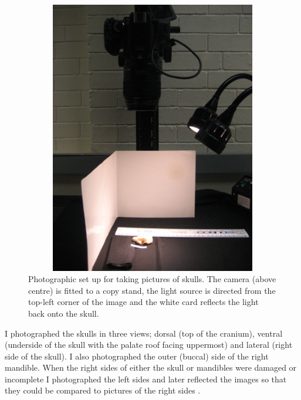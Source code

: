 \begin{figure}[h] 
  \centering
  \includegraphics[width=12cm, height=12cm, keepaspectratio=true]{Methods/figures/camera.jpg}
    \caption[Photographic set up]
    {Photographic set up for taking pictures of skulls. The camera (above centre) is fitted to a copy stand, the light source is directed from the top-left corner of the image and the white card reflects the light back onto the skull. }
  \label{fig:camera}
  \end{figure}

	I photographed the skulls in three views; dorsal (top of the cranium), ventral (underside of the skull with the palate roof facing uppermost) and lateral (right side of the skull). I also photographed the outer (buccal) side of the right mandible. When the right sides of either the skull or mandibles were damaged or incomplete I photographed the left sides and later reflected the images so that they could be compared to pictures of the right sides \citep[e.g.][]{Barrow2008}.


